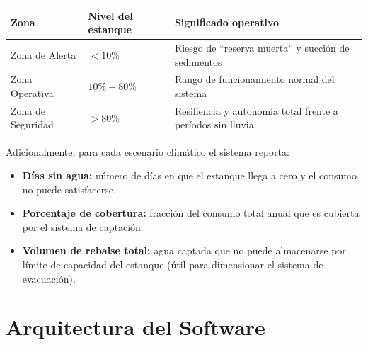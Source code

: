 \documentclass[12pt, a4paper]{article}
\begin{document}
\begin{center}
\begin{tabular}{lll}
\toprule
\textbf{Zona} & \textbf{Nivel del estanque} & \textbf{Significado operativo} \\
\midrule
Zona de Alerta & $< 10\%$ & Riesgo de ``reserva muerta'' y succión de sedimentos \\
Zona Operativa & $10\% - 80\%$ & Rango de funcionamiento normal del sistema \\
Zona de Seguridad & $> 80\%$ & Resiliencia y autonomía total frente a períodos sin lluvia \\
\bottomrule
\end{tabular}
\end{center}

Adicionalmente, para cada escenario climático el sistema reporta:

\begin{itemize}
    \item \textbf{Días sin agua:} número de días en que el estanque llega a cero y el consumo no puede satisfacerse.
    \item \textbf{Porcentaje de cobertura:} fracción del consumo total anual que es cubierta por el sistema de captación.
    \item \textbf{Volumen de rebalse total:} agua captada que no puede almacenarse por límite de capacidad del estanque (útil para dimensionar el sistema de evacuación).
\end{itemize}

\section{Arquitectura del Software}
\end{document}
